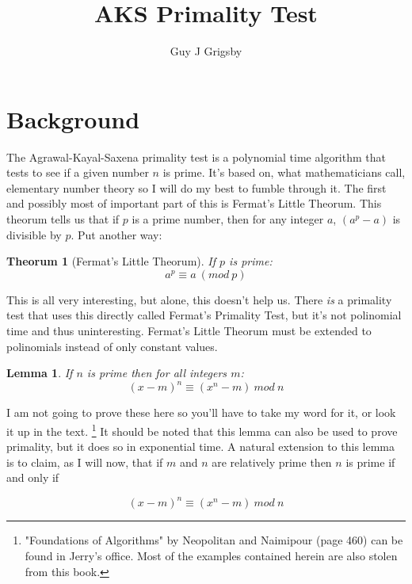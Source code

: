 \documentclass[11pt]{article}
\title{\textbf{AKS Primality Test}}
\author{Guy J Grigsby}
\begin{document}
\maketitle
\vspace{2pc}
\section{Background}
The Agrawal-Kayal-Saxena primality test is a polynomial time algorithm that tests to see if a given number $n$ is prime. It's based on, what mathematicians call, elementary number theory so I will do my best to fumble through it. The first and possibly most of important part of this is Fermat's Little Theorum. This theorum tells us that if $p$ is a prime number, then for any integer $a$, $(a^p - a)$ is divisible by $p$. Put another way:
	
\newtheorem{thm}{Theorum}\label{fermat}
\begin{thm}[Fermat's Little Theorum]
If $p$ is prime:
\begin{equation}
a^p \equiv a\ (mod\ p)
\end{equation}
\end{thm}

This is all very interesting, but alone, this doesn't help us. There \emph{is} a primality test that uses this directly called Fermat's Primality Test, but it's not polinomial time and thus uninteresting. Fermat's Little Theorum must be extended to polinomials instead of only constant values.

\newtheorem{lemma}{Lemma}\label{congruencyLemma}
\begin{lemma}
If $n$ is prime then for all integers $m$:
\begin{equation}
(x-m)^n \equiv (x^n -m)\ mod\ n
\end{equation}
\end{lemma}

I am not going to prove these here so you'll have to take my word for it, or look it up in the text. \footnote{"Foundations of Algorithms" by Neopolitan and Naimipour (page 460) can be found in Jerry's office. Most of the examples contained herein are also stolen from this book.} It should be noted that this lemma can also be used to prove primality, but it does so in exponential time. A natural extension to this lemma is to claim, as I will now, that if $m$ and $n$ are relatively prime then $n$ is prime if and only if 

$$(x-m)^n \equiv (x^n -m)\ mod\ n$$
\end{document}
